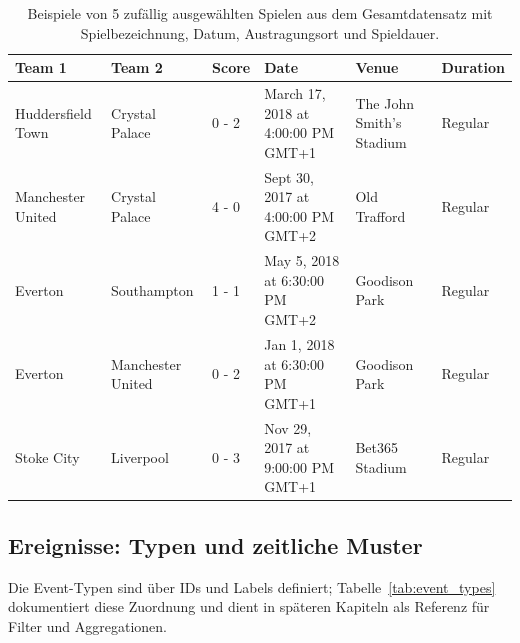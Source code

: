 \begin{table}[htbp]
\centering
\small
\begin{tabularx}{\linewidth}{lllXXl}
\toprule
Team 1 & Team 2 & Score & Date & Venue & Duration \\
\midrule
Huddersfield Town & Crystal Palace & 0 - 2 & March 17, 2018 at 4:00:00 PM GMT+1 & The John Smith's Stadium & Regular \\ \addlinespace
Manchester United & Crystal Palace & 4 - 0 & Sept 30, 2017 at 4:00:00 PM GMT+2 & Old Trafford & Regular \\ \addlinespace
Everton & Southampton & 1 - 1 & May 5, 2018 at 6:30:00 PM GMT+2 & Goodison Park & Regular \\ \addlinespace
Everton & Manchester United & 0 - 2 & Jan 1, 2018 at 6:30:00 PM GMT+1 & Goodison Park & Regular \\ \addlinespace
Stoke City & Liverpool & 0 - 3 & Nov 29, 2017 at 9:00:00 PM GMT+1 & Bet365 Stadium & Regular \\
\bottomrule
\end{tabularx}
\caption{Beispiele von 5 zufällig ausgewählten Spielen aus dem Gesamtdatensatz mit Spielbezeichnung, Datum, Austragungsort und Spieldauer.}
\label{tab:matches_sample}
\end{table}

\subsection{Ereignisse: Typen und zeitliche Muster}

Die Event-Typen sind über IDs und Labels definiert; Tabelle~\ref{tab:event_types} dokumentiert diese Zuordnung und dient in späteren Kapiteln als Referenz für Filter und Aggregationen.


